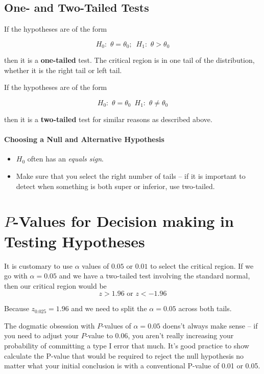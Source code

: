 \documentclass[a4paper,12pt]{report}
\begin{document}
\subsection{One- and Two-Tailed Tests}

If the hypotheses are of the form

$$H_0:\,\, \theta = \theta_0; \,\,\, H_1: \,\, \theta > \theta_0$$

then it is a \textbf{one-tailed} test. The critical region is in one tail of the distribution, whether it is the right tail or left tail.


If the hypotheses are of the form 

$$H_0:\,\, \theta = \theta_0 \,\,\, H_1: \,\, \theta \neq \theta_0$$

then it is a \textbf{two-tailed} test for similar reasons as described above.


\paragraph{Choosing a Null and Alternative Hypothesis} 

\begin{itemize}
\item $H_0$ often has an \textit{equals sign}. 
\item Make sure that you select the right number of tails -- if it is important to detect when something is both super or inferior, use two-tailed.
\end{itemize}


\section{$P$-Values for Decision making in Testing Hypotheses}

It is customary to use $\alpha$ values of $0.05$ or $0.01$ to select the critical region. If we go with $\alpha = 0.05$ and we have a two-tailed test involving the standard normal, then our critical region would be $$z > 1.96 \text{ or } z < -1.96$$

Because $z_{0.025} = 1.96$ and we need to split the $\alpha = 0.05$ across both tails. 

The dogmatic obsession with $P$-values of $\alpha = 0.05$ doens't always make sense -- if you need to adjust your $P$-value to $0.06$, you aren't really increasing your probability of committing a type I error that much. It's good practice to show calculate the P-value that would be required to reject the null hypothesis no matter what your initial conclusion is with a conventional P-value of 0.01 or 0.05.
\end{document}
